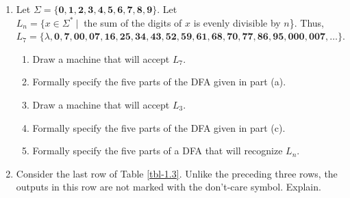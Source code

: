 \begin{enumerate}[{1.}1.]
\item Let $\Sigma=\{\pmb{0},\pmb{1},\pmb{2},\pmb{3},\pmb{4},\pmb{5},\pmb{6},
\pmb{7},\pmb{8},\pmb{9}\}$. Let \\
$L_n=\{x \in \Sigma^* \ | \ $ the sum of the digits of $x$ is evenly divisible by
$n$\}. Thus, \\
$L_7=\{\lambda,\pmb{0},\pmb{7},\pmb{00},\pmb{07},\pmb{16},\pmb{25},\pmb{34},
\pmb{43},\pmb{52},\pmb{59},\pmb{61},\pmb{68},\pmb{70},\pmb{77},\pmb{86},\pmb{95},
\pmb{000},\pmb{007},\ldots\}$.
\begin{enumerate}
\item Draw a machine that will accept $L_7$.
\item Formally specify the five parts of the DFA given in part (a).
\item Draw a machine that will accept $L_3$.
\item Formally specify the five parts of the DFA given in part (c).
\item Formally specify the five parts of a DFA that will recognize $L_n$.
\end{enumerate}

\item Consider the last row of Table \ref{tbl-1.3}. Unlike the preceding three
rows, the outputs in this row are not marked with the don't-care symbol. Explain.

\end{enumerate}
